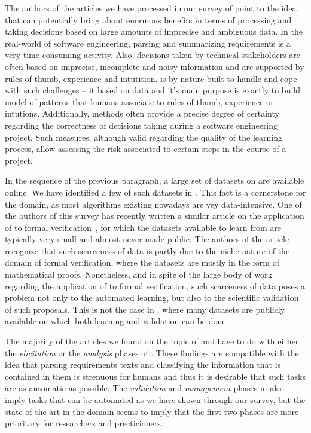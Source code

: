 The authors of the articles we have processed in our survey of point
to the idea that \ML can potentially bring about enormous benefits in terms of
processing and taking decisions based on  large amounts of imprecise and
ambiguous data. In the real-world of software
engineering, parsing and summarizing requirements is a very time-consuming
activity. Also, decisions taken by technical stakeholders are often based on imprecise,
incomplete and noisy information and are supported by rules-of-thumb, experience
and intutition. \ML is by nature built to handle and cope with such challenges
-- it based on data and it's main purpose is exactly to build model of patterns
that humans associate to rules-of-thumb, experience or intutions. Additionally,
\ML methods often provide a precise degree of certainty regarding the
correctness of decisions taking during a software engineering project. Such
measures, although valid regarding the quality of the learning process, allow
assessing the risk associated to certain steps in the course of a project.

In the sequence of the previous paragraph, a large set of datasets
on \RE are available online. We have identified a few of such datasets in
. This fact is a cornerstone for the domain, as most \ML
algorithms existing nowadays are vey data-intensive. One of the authors of this
survey has recently written a similar article on the application of \ML to
formal verification~\cite{AmLuBi:2018}, for which the datasets available
to learn from are typically very small and almost never made public. The authors
of the article recognize that such scarceness of data is partly due to the niche
nature of the domain of formal verification, where the datasets are mostly in
the form of mathematical proofs. Nonetheless, and in spite of the large body of
work regarding the application of \ML to formal verification, such scarceness of
data poses a problem not only to the automated learning, but also to the
scientific validation of such proposals. This is not the case in \RE, where many
datasets are publicly available on which both learning and validation can be
done.

The majority of the articles we found on the topic of \ML and \RE have to do
with either the \emph{elicitation} or the \emph{analysis} phases of \RE{}. These findings are compatible with the idea that parsing
requirements texts and classifying the information that is contained in them is
strenuous for humans and thus it is desirable that such tasks are as automatic
as possible. The \emph{validation} and \emph{management} phases in \RE also
imply tasks that can be automated as we have shown through our survey, but
the state of the art in the domain seems to imply that the first two phases are
more prioritary for researchers and precticioners.

